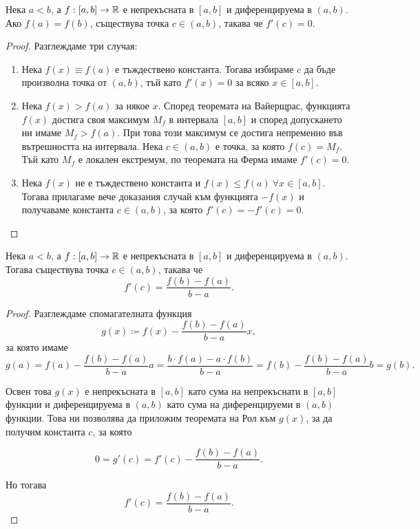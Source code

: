 \documentclass[numbers=endperiod, DIV=15, bibliography=totocnumbered]{scrartcl}
\begin{document}
\begin{theorem}[Рол]
  Нека $a < b$, а $f: [a, b] \to \mathbb{R}$ е непрекъсната в $[a, b]$ и диференцируема в $(a, b)$. Ако $f(a) = f(b)$, съществува точка $c \in (a, b)$, такава че $f'(c) = 0$.
\end{theorem}
\begin{proof}
  Разглеждаме три случая:
  \begin{enumerate}
    \item Нека $f(x) \equiv f(a)$ е тъждествено константа. Тогава избираме $c$ да бъде произволна точка от $(a, b)$, тъй като $f'(x) = 0$ за всяко $x \in [a, b]$.
    \item Нека $f(x) > f(a)$ за някое $x$. Според теоремата на Вайерщрас, функцията $f(x)$ достига своя максимум $M_f$ в интервала $[a, b]$ и според допускането ни имаме $M_f > f(a)$. При това този максимум се достига непременно във вътрешността на интервала. Нека $c \in (a, b)$ е точка, за която $f(c) = M_f$. Тъй като $M_f$ е локален екстремум, по теоремата на Ферма имаме $f'(c) = 0$.
    \item Нека $f(x)$ не е тъждествено константа и $f(x) \leq f(a)~\forall x \in [a, b]$. Тогава прилагаме вече доказания случай към функцията $-f(x)$ и получаваме константа $c \in (a, b)$, за която $f'(c) = -f'(c) = 0$.
  \end{enumerate}
\end{proof}

\begin{theorem}
  Нека $a < b$, а $f: [a, b] \to \mathbb{R}$ е непрекъсната в $[a, b]$ и диференцируема в $(a, b)$. Тогава съществува точка $c \in (a, b)$, такава че
  \begin{displaymath}
    f'(c) = \frac {f(b) - f(a)} {b-a}.
  \end{displaymath}
\end{theorem}
\begin{proof}
  Разглеждаме спомагателната функция
  \begin{displaymath}
    g(x) \coloneqq f(x) - \frac {f(b) - f(a)} {b-a} x,
  \end{displaymath}
  за която имаме
  \begin{displaymath}
    g(a)
    =
    f(a) - \frac {f(b) - f(a)} {b-a} a
    =
    \frac {b \cdot f(a) - a \cdot f(b)} {b-a}
    =
    f(b) - \frac {f(b) - f(a)} {b-a} b
    =
    g(b).
  \end{displaymath}

  Освен това $g(x)$ е непрекъсната в $[a, b]$ като сума на непрекъснати в $[a, b]$ функции и диференцируема в $(a, b)$ като сума на диференцируеми в $(a, b)$ функции. Това ни позволява да приложим теоремата на Рол към $g(x)$, за да получим константа $c$, за която

  \begin{displaymath}
    0 = g'(c) = f'(c) - \frac {f(b) - f(a)} {b-a}.
  \end{displaymath}

  Но тогава
  \begin{displaymath}
    f'(c) = \frac {f(b) - f(a)} {b-a}.
  \end{displaymath}
\end{proof}
\end{document}
